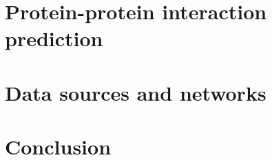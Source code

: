\lipsum[4-8]


\section{Protein-protein interaction prediction}

\lipsum[3-10]



\section{Data sources and networks}

\lipsum[11-15]

\section*{Conclusion}

\lipsum[16]
